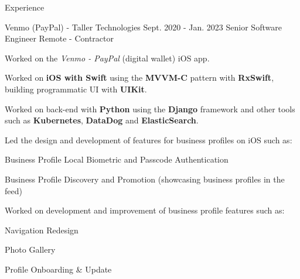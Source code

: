 \documentclass{curriculum}
\begin{document}
\begin{cvsection}{Experience}
\begin{sectionitemlist}
        \end{sectionitemlist}


    \makesectionitemheader
        {Venmo (PayPal) - Taller Technologies}      {Sept. 2020 - Jan. 2023}
        {Senior Software Engineer}                  {Remote - Contractor}

        \begin{sectionitemlist}

        \item{
            Worked on the \textit{Venmo - PayPal} (digital wallet) iOS app.
        }

        \item{
            Worked on \textbf{iOS with Swift} using the \textbf{MVVM-C} pattern with \textbf{RxSwift},
            building programmatic UI with \textbf{UIKit}.
        }

        \item{
            Worked on back-end with \textbf{Python} using the \textbf{Django} framework
            and other tools such as \textbf{Kubernetes}, \textbf{DataDog} and \textbf{ElasticSearch}.
        }

        \item{
            Led the design and development of features for business profiles on iOS such as:
        }{
            \begin{colsectionitemlist}{2}
            \item{Business Profile Local Biometric and Passcode Authentication}
            \item{Business Profile Discovery and Promotion (showcasing business profiles in the feed)}
            \end{colsectionitemlist}
        }

        \item{
            Worked on development and improvement of business profile features such as:
        }{
            \begin{colsectionitemlist}{2}
            \item{Navigation Redesign}
            \item{Photo Gallery}
            \item{Profile Onboarding \& Update}
            \end{colsectionitemlist}
        }


\end{sectionitemlist}
\end{cvsection}
\end{document}

